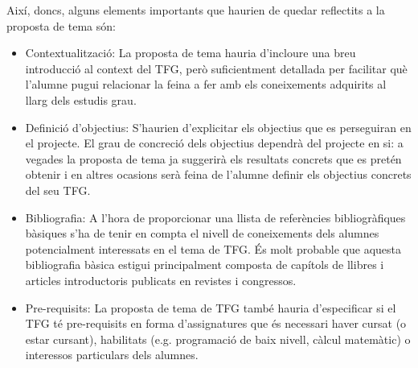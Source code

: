 Així, doncs, alguns elements importants que haurien de quedar reflectits a la proposta de tema són:
\begin{itemize}
\item Contextualització: La proposta de tema hauria d'incloure una breu introducció al context del \ac{TFG}, però suficientment detallada per facilitar què l'alumne pugui relacionar la feina a fer amb els coneixements adquirits al llarg dels estudis grau.
\item Definició d'objectius: S'haurien d'explicitar els objectius que es perseguiran en el projecte. El grau de concreció dels objectius dependrà del projecte en si: a vegades la proposta de tema ja suggerirà els resultats concrets que es pretén obtenir i en altres ocasions serà feina de l'alumne definir els objectius concrets del seu \ac{TFG}.
\item Bibliografia: A l'hora de proporcionar una llista de referències bibliogràfiques bàsiques s'ha de tenir en compta el nivell de coneixements dels alumnes potencialment interessats
    en el tema de \ac{TFG}. És molt probable que aquesta bibliografia bàsica estigui principalment composta de capítols de llibres i articles introductoris publicats en revistes i congressos.
\item Pre-requisits: La proposta de tema de \ac{TFG} també hauria d'especificar si el \ac{TFG} té pre-requisits en forma d'assignatures que és necessari haver cursat (o estar cursant), habilitats (e.g. programació de baix nivell, càlcul matemàtic) o interessos particulars dels alumnes.
\end{itemize}

